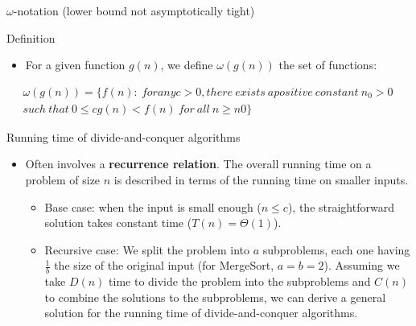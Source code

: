 \begin{frame}{$\omega$-notation (lower bound not asymptotically tight)}

  \begin{block}{Definition}
    \begin{itemize}
    \item For a given function $g(n)$, we define
      $\omega(g(n))$ the set of functions:
    \end{itemize}
    
    \begin{small}
      \begin{multline*}
        \omega(g(n)) = \{ f(n):\ for any c > 0, there\ exists\ a positive\ constant\ n_0 > 0\ \\ such\ that\ 
                       0 \leq cg(n) < f(n) \ for\ all\ n \geq n0\}
      \end{multline*}
    \end{small}
  \end{block}

\end{frame}


\begin{frame}{Running time of divide-and-conquer algorithms}

  \begin{itemize}
   \item Often involves a {\bf recurrence relation}. \pause
     The overall running time on a problem of size $n$ is described
     in terms of the running time on smaller inputs.

     \begin{itemize}
       \item Base case: when the input is small enough ($n \leq c$),
         the straightforward solution takes constant time ($T(n) = \Theta(1)$). \pause
         
       \item Recursive case: We split the problem into $a$ subproblems,
         each one having $\frac{1}{b}$ the size of the original input \pause(for MergeSort,
         $a = b = 2$). \pause Assuming we take $D(n)$ time to divide the problem into
         the subproblems and $C(n)$ to combine the solutions to the subproblems,
         we can derive a general solution for the running time of divide-and-conquer
         algorithms.
     \end{itemize}
  \end{itemize}
\end{frame}

